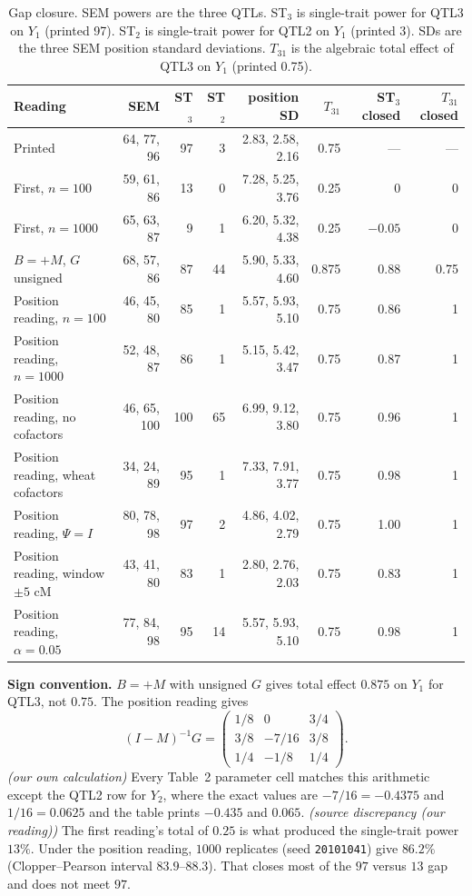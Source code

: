\documentclass[11pt]{article}
\newcommand{\ev}[1]{\textup{\emph{(#1)}}}
\begin{document}
\begin{table}[ht]
\centering
\footnotesize
\caption{Gap closure. SEM powers are the three QTLs. ST$_3$ is single-trait
power for QTL3 on $Y_1$ (printed 97). ST$_2$ is single-trait power for QTL2
on $Y_1$ (printed 3). SDs are the three SEM position standard deviations.
$T_{31}$ is the algebraic total effect of QTL3 on $Y_1$ (printed 0.75).}
\label{tab:gaps}
\begin{tabular}{lrrrrrrr}
\hline
Reading & SEM & ST$_3$ & ST$_2$ & position SD & $T_{31}$ & ST$_3$ closed & $T_{31}$ closed \\
\hline
Printed & 64, 77, 96 & 97 & 3 & 2.83, 2.58, 2.16 & 0.75 & --- & --- \\
First, $n=100$ & 59, 61, 86 & 13 & 0 & 7.28, 5.25, 3.76 & 0.25 & 0 & 0 \\
First, $n=1000$ & 65, 63, 87 & 9 & 1 & 6.20, 5.32, 4.38 & 0.25 & $-0.05$ & 0 \\
$B=+M$, $G$ unsigned & 68, 57, 86 & 87 & 44 & 5.90, 5.33, 4.60 & 0.875 & 0.88 & 0.75 \\
Position reading, $n=100$ & 46, 45, 80 & 85 & 1 & 5.57, 5.93, 5.10 & 0.75 & 0.86 & 1 \\
Position reading, $n=1000$ & 52, 48, 87 & 86 & 1 & 5.15, 5.42, 3.47 & 0.75 & 0.87 & 1 \\
Position reading, no cofactors & 46, 65, 100 & 100 & 65 & 6.99, 9.12, 3.80 & 0.75 & 0.96 & 1 \\
Position reading, wheat cofactors & 34, 24, 89 & 95 & 1 & 7.33, 7.91, 3.77 & 0.75 & 0.98 & 1 \\
Position reading, $\Psi=I$ & 80, 78, 98 & 97 & 2 & 4.86, 4.02, 2.79 & 0.75 & 1.00 & 1 \\
Position reading, window $\pm 5$ cM & 43, 41, 80 & 83 & 1 & 2.80, 2.76, 2.03 & 0.75 & 0.83 & 1 \\
Position reading, $\alpha=0.05$ & 77, 84, 98 & 95 & 14 & 5.57, 5.93, 5.10 & 0.75 & 0.98 & 1 \\
\hline
\end{tabular}
\end{table}

\textbf{Sign convention.} $B=+M$ with unsigned $G$ gives total effect $0.875$
on $Y_1$ for QTL3, not $0.75$. The position reading gives
\[
(I-M)^{-1}G
=\begin{pmatrix}1/8&0&3/4\\ 3/8&-7/16&3/8\\ 1/4&-1/8&1/4\end{pmatrix}.
\]
\ev{our own calculation}
Every Table~2 parameter cell matches this arithmetic except the QTL2 row for
$Y_2$, where the exact values are $-7/16=-0.4375$ and $1/16=0.0625$ and the
table prints $-0.435$ and $0.065$.
\ev{source discrepancy (our reading)}
The first reading's total of $0.25$ is what produced the single-trait power
$13\%$. Under the position reading, $1000$ replicates (seed \texttt{20101041})
give $86.2\%$ (Clopper--Pearson interval $83.9$--$88.3$). That closes most of
the $97$ versus $13$ gap and does not meet $97$.
\end{document}
